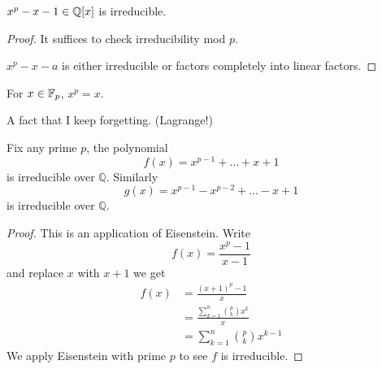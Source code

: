 \begin{prop}
    $x^p-x-1\in\mathbb{Q}[x]$ is irreducible. 
\end{prop}
\begin{proof}
    It suffices to check irreducibility mod $p$. 

    $x^p-x-a$ is either irreducible or factors completely into linear factors. 
\end{proof}



\begin{prop}
    For $x\in\mathbb{F}_p$, $x^p=x$.
\end{prop}
A fact that I keep forgetting. (Lagrange!)



\begin{prop}
    Fix any prime $p$, the polynomial 
    \begin{equation*}
        f(x)=x^{p-1}+\dots+x+1
    \end{equation*}
    is irreducible over $\mathbb{Q}$. Similarly 
    \begin{equation*}
        g(x)=x^{p-1}-x^{p-2}+\dots-x+1
    \end{equation*}
    is irreducible over $\mathbb{Q}$.
\end{prop}
\begin{proof}
    This is an application of Eisenstein. Write 
    \begin{equation*}
        f(x)=\frac{x^p-1}{x-1}
    \end{equation*}
    and replace $x$ with $x+1$ we get 
    \begin{align*}
        f(x)&=\frac{(x+1)^{p}-1}{x}\\
        &=\frac{\sum_{k=1}^n\binom{p}{k}x^k}{x}\\
        &=\sum_{k=1}^n\binom{p}{k}x^{k-1}
    \end{align*}
    We apply Eisenstein with prime $p$ to see $f$ is irreducible.
\end{proof}

